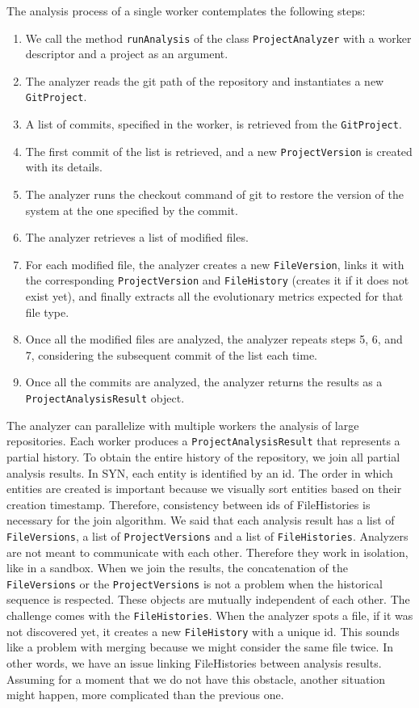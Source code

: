 The analysis process of a single worker contemplates the following steps:
\begin{enumerate}
    \item We call the method \texttt{runAnalysis} of the class \texttt{ProjectAnalyzer} with a worker descriptor and a project as an argument. 
    \item The analyzer reads the git path of the repository and instantiates a new \texttt{GitProject}. 
    \item A list of commits, specified in the worker, is retrieved from the \texttt{GitProject}.
    \item The first commit of the list is retrieved, and a new \texttt{ProjectVersion} is created with its details. 
    \item The analyzer runs the checkout command of git to restore the version of the system at the one specified by the commit. 
    \item The analyzer retrieves a list of modified files. 
    \item For each modified file, the analyzer creates a new \texttt{FileVersion}, links it with the corresponding  \texttt{ProjectVersion} and \texttt{FileHistory} (creates it if it does not exist yet), and finally extracts all the evolutionary metrics expected for that file type.
    \item Once all the modified files are analyzed, the analyzer repeats steps 5, 6, and 7, considering the subsequent commit of the list each time. 
    \item Once all the commits are analyzed, the analyzer returns the results as a \texttt{ProjectAnalysisResult} object. 
\end{enumerate}


The analyzer can parallelize with multiple workers the analysis of large repositories. Each worker produces a \texttt{ProjectAnalysisResult} that represents a partial history. To obtain the entire history of the repository, we join all partial analysis results. 
In SYN, each entity is identified by an id. 
The order in which entities are created is important because we visually sort entities based on their creation timestamp. 
Therefore, consistency between ids of FileHistories is necessary for the join algorithm.
We said that each analysis result has a list of \texttt{FileVersions}, a list of \texttt{ProjectVersions} and a list of \texttt{FileHistories}. 
Analyzers are not meant to communicate with each other. Therefore they work in isolation, like in a sandbox. 
When we join the results, the concatenation of the \texttt{FileVersions} or the \texttt{ProjectVersions} is not a problem when the historical sequence is respected. 
These objects are mutually independent of each other.
The challenge comes with the \texttt{FileHistories}. When the analyzer spots a file, if it was not discovered yet, it creates a new \texttt{FileHistory} with a unique id. 
This sounds like a problem with merging because we might consider the same file twice. In other words, we have an issue linking FileHistories between analysis results.
Assuming for a moment that we do not have this obstacle, another situation might happen, more complicated than the previous one.
 
